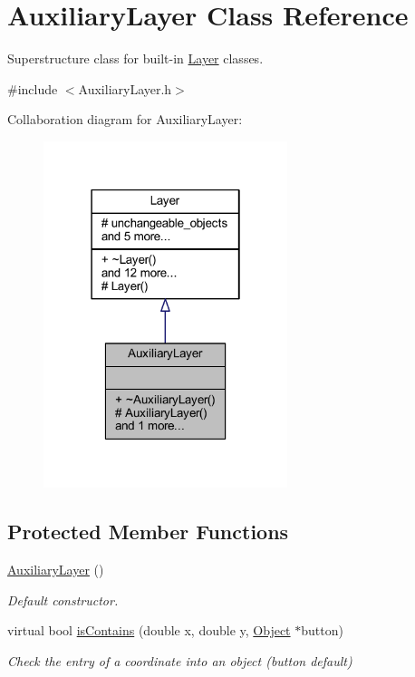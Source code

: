 \hypertarget{class_auxiliary_layer}{}\section{Auxiliary\+Layer Class Reference}
\label{class_auxiliary_layer}


Superstructure class for built-\/in \hyperlink{class_layer}{Layer} classes.  




{\ttfamily \#include $<$Auxiliary\+Layer.\+h$>$}



Collaboration diagram for Auxiliary\+Layer\+:\nopagebreak
\begin{figure}[H]
\begin{center}
\leavevmode
\includegraphics[width=202pt]{class_auxiliary_layer__coll__graph}
\end{center}
\end{figure}
\subsection*{Protected Member Functions}
\begin{DoxyCompactItemize}
\item 
\mbox{\label{class_auxiliary_layer_a14a068a62e260548e70859a506a2fe7d}} 
\hyperlink{class_auxiliary_layer_a14a068a62e260548e70859a506a2fe7d}{Auxiliary\+Layer} ()
\begin{DoxyCompactList}\small\item\em Default constructor. \end{DoxyCompactList}\item 
virtual bool \hyperlink{class_auxiliary_layer_a2e8e6d2252aa08fc4e329b1301c52908}{is\+Contains} (double x, double y, \hyperlink{class_object}{Object} $\ast$button)
\begin{DoxyCompactList}\small\item\em Check the entry of a coordinate into an object (button default) \end{DoxyCompactList}\end{DoxyCompactItemize}
